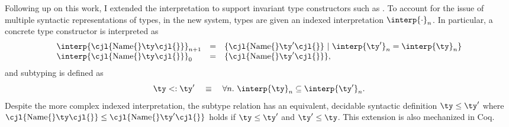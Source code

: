 Following up on this work, I extended the interpretation to support
invariant type constructors such as .
To account for the issue of multiple syntactic representations of types,
in the new system, types are given an indexed interpretation $\interp{\cdot}_n$.
In particular, a concrete type constructor  is interpreted as
\[
\begin{array}{lcl}
  \interp{\text{\cjl{Name\{}}\ty\text{\cjl{\}}}}_{n+1} & = &
  \{ \text{\cjl{Name\{}}\ty'\text{\cjl{\}}}
  \ |\ \interp{\ty'}_n = \interp{\ty}_n \}    \\
  \interp{\text{\cjl{Name\{}}\ty\text{\cjl{\}}}}_{0} & = &
  \{ \text{\cjl{Name\{}}\ty'\text{\cjl{\}}} \},
\end{array}
\]
and subtyping is defined as
\[
  \ty <: \ty' \quad \equiv \quad
  \forall n.\ \interp{\ty}_n \subseteq \interp{\ty'}_n.
\]
Despite the more complex indexed interpretation, the subtype relation has
an equivalent, decidable syntactic definition $\ty \leq \ty'$ where
$\text{\cjl{Name\{}}\ty\text{\cjl{\}}} \leq
\text{\cjl{Name\{}}\ty'\text{\cjl{\}}}$
holds if $\ty \leq \ty'$ and $\ty' \leq \ty$.
This extension is also mechanized in Coq.

